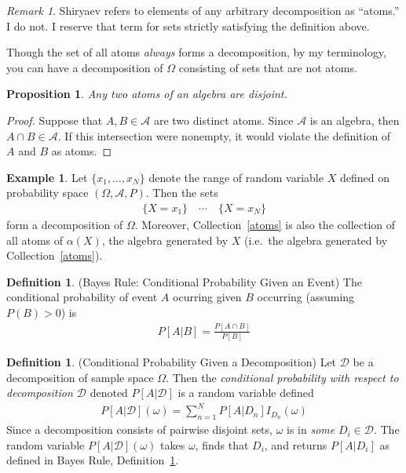\documentclass[12pt]{article}
\theoremstyle{plain}
\newtheorem{prop}[thm]{Proposition}
\theoremstyle{definition}
\newtheorem{defn}[thm]{Definition}
\newtheorem{ex}[thm]{Example}
\theoremstyle{remark}
\newtheorem*{rmk}{Remark}
\newcommand{\sD}{\mathscr{D}}
\newcommand{\sA}{\mathscr{A}}
\newcommand{\sumnN}{\sum^N_{n=1}}
\begin{document}
\begin{rmk}
Shiryaev refers to elements of any arbitrary decomposition as ``atoms.''
I do not. I reserve that term for sets strictly satisfying the
definition above.

Though the set of all atoms \emph{always} forms a decomposition, by my
terminology, you can have a decomposition of $\Omega$ consisting of sets
that are not atoms.
\end{rmk}

\begin{prop}
Any two atoms of an algebra are disjoint.
\end{prop}
\begin{proof}
Suppose that $A,B\in\sA$ are two distinct atoms. Since $\sA$ is an
algebra, then $A\cap B\in\sA$. If this intersection were nonempty, it
would violate the definition of $A$ and $B$ as atoms.
\end{proof}


\begin{ex}
Let $\{x_1,\ldots,x_N\}$ denote the range of random variable $X$ defined
on probability space $(\Omega,\sA,P)$. Then the sets
\begin{align}
  \{X=x_1\}\quad\cdots\quad\{X=x_N\}
  \label{atoms}
\end{align}
form a decomposition of $\Omega$. Moreover, Collection~\ref{atoms}
is also the collection of all atoms of $\alpha(X)$, the algebra
generated by $X$ (i.e.\ the algebra generated by Collection~\ref{atoms}).
\end{ex}


\begin{defn}(Bayes Rule: Conditional Probability Given an Event)
\label{defn:bayesrule}
The conditional probability of event $A$ ocurring given $B$ occurring
(assuming $P(B)>0$) is
\begin{align*}
  P[A|B] = \frac{P[A\cap B]}{P[B]}
\end{align*}
\end{defn}

\begin{defn}(Conditional Probability Given a Decomposition)
Let $\sD$ be a decomposition of sample space $\Omega$. Then
the \emph{conditional probability with respect to decomposition $\sD$}
denoted $P[A|\sD]$ is a random variable defined
\begin{align*}
  P[A|\sD](\omega) = \sumnN P[A|D_n] I_{D_n}(\omega)
\end{align*}
Since a decomposition consists of pairwise disjoint sets, $\omega$ is in
\emph{some} $D_i\in\sD$. The random variable $P[A|\sD](\omega)$ takes
$\omega$, finds that $D_i$, and returns $P[A|D_i]$ as defined in Bayes
Rule, Definition~\ref{defn:bayesrule}.
\end{defn}
\end{document}
